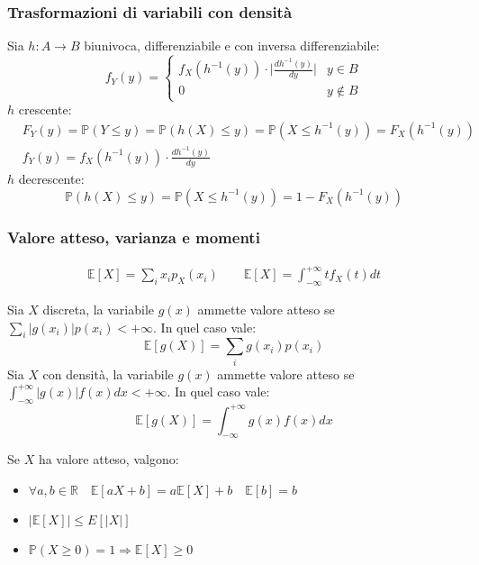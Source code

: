 \subsubsection{Trasformazioni di variabili con densità}
\begin{proposition}
	Sia $h: A \to B$ biunivoca, differenziabile e con inversa differenziabile:
	\begin{equation}
		f_Y(y) = \begin{cases}
			f_X(h^{-1}(y)) \cdot \bigg\lvert \frac{dh^{-1}(y)}{dy} \bigg\rvert & y \in B\\
			0 & y \notin B
		\end{cases}\tag{Cambio di variabile}
	\end{equation}
	$h$ crescente:
	\begin{align}
		& F_Y(y)=\mathbb{P}(Y\leq y) = \mathbb{P}(h(X) \leq y) = \mathbb{P}(X \leq h^{-1}(y)) = F_X(h^{-1}(y))\\
		& f_Y(y)=f_X(h^{-1}(y))\cdot \frac{dh^{-1}(y)}{dy}
	\end{align}
	$h$ decrescente:
	\begin{equation}
		\mathbb{P}(h(X) \leq y) = \mathbb{P}(X \leq h^{-1}(y)) = 1 - F_X(h^{-1}(y))
	\end{equation}
\end{proposition}

\subsubsection{Valore atteso, varianza e momenti}
\begin{align}
	\mathbb{E}[X] = \sum_i x_i p_X(x_i) \quad\quad \mathbb{E}[X] = \int_{-\infty}^{+\infty} tf_X(t)dt \tag{Valore atteso}
\end{align}

\begin{proposition}
	Sia $X$ discreta, la variabile $g(x)$ ammette valore atteso se $\sum_i \lvert g(x_i) \rvert p(x_i) < +\infty$. In quel caso vale:
	\begin{equation}
		\mathbb{E}[g(X)] = \sum_i g(x_i)p(x_i)
	\end{equation}
	Sia $X$ con densità, la variabile $g(x)$ ammette valore atteso se $\int_{-\infty}^{+\infty} \lvert g(x) \rvert f(x) dx < +\infty$. In quel caso vale:
	\begin{equation}
		\mathbb{E}[g(X)] = \int_{-\infty}^{+\infty} g(x)f(x) dx
	\end{equation}
\end{proposition}
\begin{proposition}
	Se $X$ ha valore atteso, valgono:
	\begin{itemize}
		\item $\forall a,b \in \mathbb{R} \quad \mathbb{E}[aX+b] = a\mathbb{E}[X]+b \quad \mathbb{E}[b]=b$
		\item $\lvert \mathbb{E}[X] \rvert \leq E[\lvert X \rvert]$
		\item $\mathbb{P}(X \geq 0) = 1 \Longrightarrow \mathbb{E}[X] \geq 0$
	\end{itemize}
\end{proposition}

